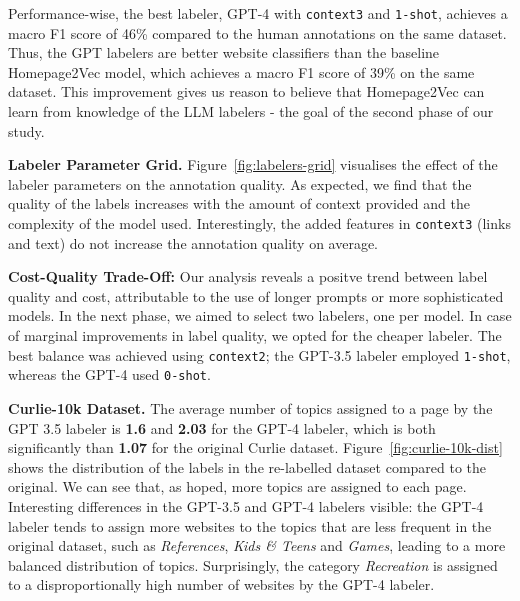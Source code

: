 Performance-wise, the best labeler, GPT-4 with \texttt{context3} and \texttt{1-shot}, achieves a macro F1 score of 46\% compared to the human annotations on the same dataset. Thus, the GPT labelers are better website classifiers than the baseline Homepage2Vec model, which achieves a macro F1 score of 39\% on the same dataset. This improvement gives us reason to believe that Homepage2Vec can learn from knowledge of the LLM labelers - the goal of the second phase of our study.




\textbf{Labeler Parameter Grid.} Figure~\ref{fig:labelers-grid} visualises the effect of the labeler parameters on the annotation quality. As expected, we find that the quality of the labels increases with the amount of context provided and the complexity of the model used. Interestingly, the added features in \texttt{context3} (links and text) do not increase the annotation quality on average.


\textbf{Cost-Quality Trade-Off:} Our analysis reveals a positve trend between label quality and cost, attributable to the use of longer prompts or more sophisticated models. In the next phase, we aimed to select two labelers, one per model. In case of marginal improvements in label quality, we opted for the cheaper labeler. 
The best balance was achieved using \texttt{context2}; the GPT-3.5 labeler employed \texttt{1-shot}, whereas the GPT-4 used \texttt{0-shot}.

\textbf{Curlie-10k Dataset.} The average number of topics assigned to a page by the GPT 3.5 labeler is \textbf{1.6} and \textbf{2.03} for the GPT-4 labeler, which is both significantly than \textbf{1.07} for the original Curlie dataset. Figure~\ref{fig:curlie-10k-dist} shows the distribution of the labels in the re-labelled dataset compared to the original. We can see that, as hoped, more topics are assigned to each page. Interesting differences in the GPT-3.5 and GPT-4 labelers visible: the GPT-4 labeler tends to assign more websites to the topics that are less frequent in the original dataset, such as \textit{References}, \textit{Kids \& Teens} and \textit{Games}, leading to a more balanced distribution of topics. Surprisingly, the category \textit{Recreation} is assigned to a disproportionally high number of websites by the GPT-4 labeler.

